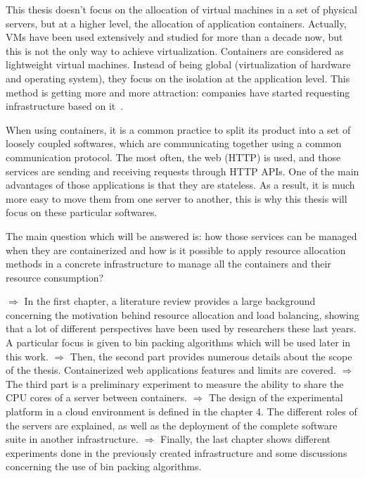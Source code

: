 This thesis doesn't focus on the allocation of virtual machines in a set of
physical servers, but at a higher level, the allocation of application
containers. Actually, VMs have been used extensively and studied for more than
a decade now, but this is not the only way to achieve virtualization.
Containers are considered as lightweight virtual machines. Instead of being
global (virtualization of hardware and operating system), they focus on the
isolation at the application level. This method is getting more and more
attraction: companies have started requesting infrastructure based on
it~\cite{dockerOverVMWare}.

When using containers, it is a common practice to split its product into
a set of loosely coupled softwares, which are communicating together using
a common communication protocol. The most often, the web (HTTP) is used, and those
services are sending and receiving requests through HTTP APIs\@. One of the main
advantages of those applications is that they are stateless. As a result, it is
much more easy to move them from one server to another, this is why this thesis
will focus on these particular softwares.

The main question which will be answered is: how those services can be managed
when they are containerized and how is it possible to apply resource allocation
methods in a concrete infrastructure to manage all the containers and their
resource consumption?

$\Rightarrow$ In the first chapter, a literature review provides a large
background concerning the motivation behind resource allocation and load
balancing, showing that a lot of different perspectives have been used by
researchers these last years. A particular focus is given to bin packing
algorithms which will be used later in this work. \vspace{5pt} \newline
$\Rightarrow$ Then, the second part provides numerous details about the scope of
the thesis. Containerized web applications features and limits are covered.
\vspace{5pt} \newline $\Rightarrow$ The third part is a preliminary experiment
to measure the ability to share the CPU cores of a server between containers.
\vspace{5pt} \newline $\Rightarrow$ The design of the experimental platform in
a cloud environment is defined in the chapter 4. The different roles of the
servers are explained, as well as the deployment of the complete software suite
in another infrastructure.\vspace{5pt} \newline $\Rightarrow$ Finally, the
last chapter shows different experiments done in the previously created
infrastructure and some discussions concerning the use of bin packing
algorithms.

 
